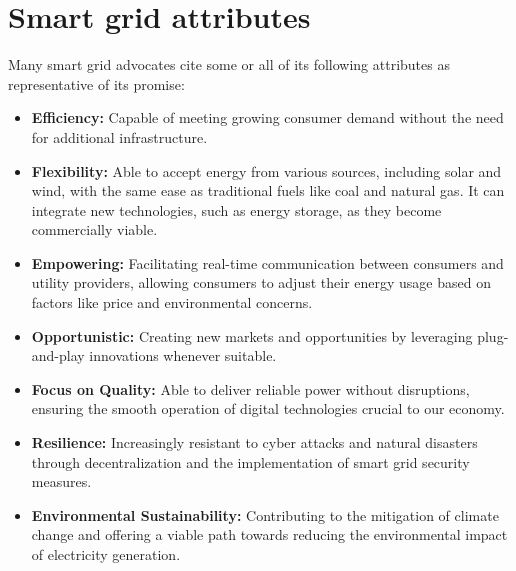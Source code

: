 \section{Smart grid attributes}
Many smart grid advocates cite some or all of its following attributes as representative of its promise:
\firmlist
\begin{itemize}


\item \textbf{  Efficiency:} Capable of meeting growing consumer demand without the need for additional infrastructure.

\item \textbf{  Flexibility: }Able to accept energy from various sources, including solar and wind, with the same ease as traditional fuels like coal and natural gas. It can integrate new technologies, such as energy storage, as they become commercially viable.

\item \textbf{  Empowering: }Facilitating real-time communication between consumers and utility providers, allowing consumers to adjust their energy usage based on factors like price and environmental concerns.

\item \textbf{  Opportunistic:} Creating new markets and opportunities by leveraging plug-and-play innovations whenever suitable.

\item\textbf{   Focus on Quality:} Able to deliver reliable power without disruptions, ensuring the smooth operation of digital technologies crucial to our economy.

\item \textbf{  Resilience:} Increasingly resistant to cyber attacks and natural disasters through decentralization and the implementation of smart grid security measures.

\item \textbf{  Environmental Sustainability:} Contributing to the mitigation of climate change and offering a viable path towards reducing the environmental impact of electricity generation. \cite{el2014smart}
\end{itemize}


